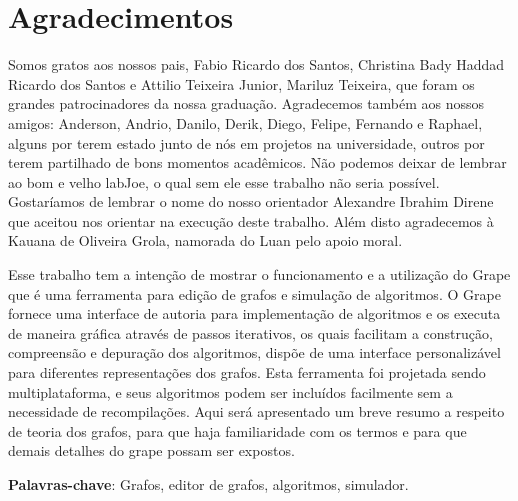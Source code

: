\documentclass[a4paper]{abnt}
\begin{document}


\capa
\folhaderosto

\chapter*{Agradecimentos}
Somos gratos aos nossos pais, Fabio Ricardo dos Santos, Christina Bady Haddad Ricardo dos Santos e Attilio Teixeira Junior, Mariluz Teixeira, que foram os grandes patrocinadores da nossa graduação. Agradecemos também aos nossos amigos: Anderson, Andrio, Danilo, Derik, Diego, Felipe, Fernando e Raphael, alguns por terem estado junto de nós em projetos na universidade, outros por terem partilhado de bons momentos acadêmicos. Não podemos deixar de lembrar ao bom e velho labJoe, o qual sem ele esse trabalho não seria possível. Gostaríamos de lembrar o nome do nosso orientador Alexandre Ibrahim Direne que aceitou nos orientar na execução deste trabalho. Além disto agradecemos à Kauana de Oliveira Grola, namorada do Luan pelo apoio moral.

\setcounter{page}{1}
\sumario
\listadefiguras
\listadetabelas

\begin{resumo}
Esse trabalho tem a intenção de mostrar o funcionamento e a utilização do Grape que é uma ferramenta para edição de grafos e simulação de algoritmos. O Grape fornece uma interface de autoria para implementação de algoritmos e os executa de maneira gráfica através de passos iterativos, os quais facilitam a construção, compreensão e depuração dos algoritmos, dispõe de uma interface personalizável para diferentes representações dos grafos. Esta ferramenta foi projetada sendo multiplataforma, e seus algoritmos podem ser incluídos facilmente sem a necessidade de recompilações. Aqui será apresentado um breve resumo a respeito de teoria dos grafos, para que haja familiaridade com os termos e para que demais detalhes do grape possam ser expostos. 

\noindent \textbf{Palavras-chave}: Grafos, editor de grafos, algoritmos, simulador.
\end{resumo}
\end{document}
